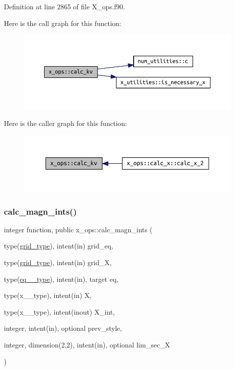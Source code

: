 Definition at line 2865 of file X\+\_\+ops.\+f90.

Here is the call graph for this function\+:\nopagebreak
\begin{figure}[H]
\begin{center}
\leavevmode
\includegraphics[width=350pt]{namespacex__ops_a045e8903230dfa0fb8b89b458d0c8ee2_cgraph}
\end{center}
\end{figure}
Here is the caller graph for this function\+:\nopagebreak
\begin{figure}[H]
\begin{center}
\leavevmode
\includegraphics[width=350pt]{namespacex__ops_a045e8903230dfa0fb8b89b458d0c8ee2_icgraph}
\end{center}
\end{figure}
\mbox{\label{namespacex__ops_a6df79622d1b95d54ab3e542751a5881d}} 
\subsubsection{\texorpdfstring{calc\+\_\+magn\+\_\+ints()}{calc\_magn\_ints()}}
{\footnotesize\ttfamily integer function, public x\+\_\+ops\+::calc\+\_\+magn\+\_\+ints (\begin{DoxyParamCaption}\item[{type(\hyperlink{structgrid__vars_1_1grid__type}{grid\+\_\+type}), intent(in)}]{grid\+\_\+eq,  }\item[{type(\hyperlink{structgrid__vars_1_1grid__type}{grid\+\_\+type}), intent(in)}]{grid\+\_\+X,  }\item[{type(\hyperlink{structeq__vars_1_1eq__2__type}{eq\+\_\+2\+\_\+type}), intent(in), target}]{eq,  }\item[{type(x\+\_\+2\+\_\+type), intent(in)}]{X,  }\item[{type(x\+\_\+2\+\_\+type), intent(inout)}]{X\+\_\+int,  }\item[{integer, intent(in), optional}]{prev\+\_\+style,  }\item[{integer, dimension(2,2), intent(in), optional}]{lim\+\_\+sec\+\_\+X }\end{DoxyParamCaption})}



